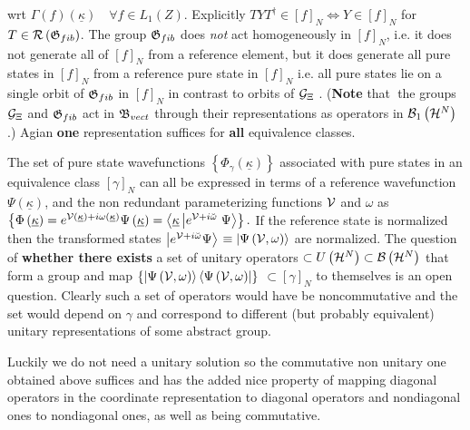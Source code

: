 wrt $\Gamma \left( f\right) \left( \underline{\kappa }\right) \quad \forall
f\in L_{1}\left( Z\right) .$ Explicitly $TYT^{\dagger }\in \left[ f\right]
_{N}\Longleftrightarrow Y\in \left[ f\right] _{N}$ for $T\in {\cal R}\left( 
{\frak G}_{fib}\right) $. The group ${\frak G}_{fib}$ does {\it not }act
homogeneously in $\left[ f\right] _{N}$, i.e. it does not generate all of $%
\left[ f\right] _{N}$ from a reference element, but it does generate all
pure states in $\left[ f\right] _{N}$ from a reference pure state in $\left[
f\right] _{N}$ i.e. all pure states lie on a single orbit of ${\frak G}%
_{fib} $ in $\left[ f\right] _{N}$ in contrast to orbits of ${\cal G}_{\Xi }$%
. ({\bf Note }that{\bf \ }the groups ${\cal G}_{\Xi }$ and ${\frak G}_{fib}$
act in ${\frak B}_{vect}$ through their representations as operators in $%
{\cal B}_{1}\left( {\cal H}^{N}\right) $.) Agian {\bf one} representation
suffices for {\bf all }equivalence classes.

The set of pure state wavefunctions $\left\{ \Phi _{\gamma }\left( 
\underline{\kappa }\right) \right\} $ associated with pure states in an
equivalence class $\left[ \gamma \right] _{N}$ can all be expressed in terms
of a reference wavefunction $\Psi \left( \underline{\kappa }\right) $, and
the non redundant parameterizing functions ${\cal V}$ and $\omega $ as $%
\left\{ \Phi \left( \underline{\kappa }\right) =e^{{\cal V}\left( \underline{%
\kappa }\right) +i\omega \left( \underline{\kappa }\right) }\Psi \left( 
\underline{\kappa }\right) =\left\langle \underline{\kappa }\left| e^{{\cal V%
}+i\breve{\omega}}\right. \Psi \right\rangle \right\} .$ If the reference
state is normalized then the transformed states $\left| e^{{\cal V}+i\breve{%
\omega}}\Psi \right\rangle $ $\equiv \left| \Psi \left( {\cal V},\omega
\right) \right\rangle $ are normalized. The question of {\bf whether there
exists} a set of unitary operators $\subset U\left( {\cal H}^{N}\right)
\subset {\cal B}\left( {\cal H}^{N}\right) $ that form a group and map $%
\left\{ \left| \Psi \left( {\cal V},\omega \right) \right\rangle
\left\langle \Psi \left( {\cal V},\omega \right) \right| \right\} $ $\subset %
\left[ \gamma \right] _{N}$ to themselves is an open question. Clearly such
a set of operators would have be noncommutative and the set would depend on $%
\gamma $ and correspond to different (but probably equivalent) unitary
representations of some abstract group.

Luckily we do not need a unitary solution so the commutative non unitary one
obtained above suffices and has the added nice property of mapping diagonal
operators in the coordinate representation to diagonal operators and
nondiagonal ones to nondiagonal ones, as well as being commutative.
